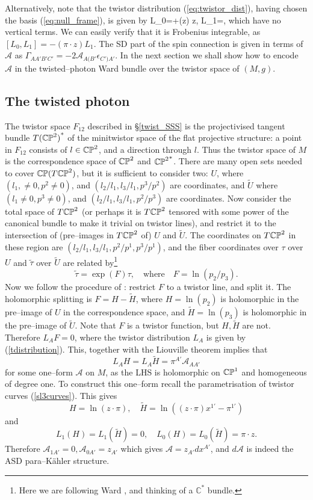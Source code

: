 Alternatively, note that the twistor distribution (\ref{eq:twistor_dist}), having chosen the basis (\ref{eq:null_frame}), is given by
\be
\label{tdistribution}
L_{0}=\pi\cdot{}+(z\cdot\pi) z\cdot{}, \quad
L_{1}=\pi\cdot{},
\ee
which have no vertical terms. We can easily verify that it is Frobenius integrable, as $[L_{0}, L_{1}]=-(\pi\cdot z)L_{1}$. The SD part of the
spin connection is given in terms of ${\mathcal A}$ as
$\Gamma_{AA'B'C'}=-2{\mathcal A}_{A(B'}\epsilon_{C')A'}$.
\koniec
In the next section we shall show how to encode
${\mathcal A}$ in the twisted--photon Ward bundle over the twistor space
of $(M, g)$.
\subsection{The twisted photon}
The twistor space $F_{12}$ described in \S\ref{twist_SSS} is the projectivised tangent bundle ${T(\mathbb{CP}^2)}^*$ of the minitwistor space of the flat projective structure: a point in $F_{12}$ consists of $l\in\mathbb{CP}^2$, and a direction through $l$. Thus the twistor space of $M$ is the correspondence space
of $\mathbb{CP}^2$ and ${\mathbb{CP}^2}^*$. 
There are many open sets needed to cover
$\mathbb{CP}(T\mathbb{CP}^2)$, but it is sufficient to consider two:
$U$, where $(l_1, \neq 0, p^2\neq 0)$, and $(l_2/l_1, l_3/l_1, p^3/p^2)$ are coordinates, and $\widetilde{U}$ where
$(l_1\neq 0, p^3\neq 0)$, and  $(l_2/l_1, l_3/l_1, p^2/p^3)$
are coordinates. Now consider the total
space of $T\mathbb{CP}^2$ (or perhaps it is $T\mathbb{CP}^2$ tensored
with some power of the canonical bundle to make it trivial on twistor
lines), and restrict it to the intersection of (pre--images in
$T\mathbb{CP}^2$
of) $U$ and $\widetilde{U}$. The coordinates on $T\mathbb{CP}^2$ in these
region are $(l_2/l_1, l_3/l_1, p^2/p^1, p^3/p^1)$, and the fiber
coordinates over $\tau$ over $U$ and $\tilde{\tau}$ over 
$\widetilde{U}$ are related by\footnote{Here we are following Ward \cite{wardtf},
and thinking of a $\mathbb{C}^*$ bundle.}
\[
\tilde \tau=\exp(F)\tau, \quad\mbox{where}\quad  
F=\ln{(p_2/p_3)}.
\]
Now we follow the procedure of \cite{wardtf}: restrict $F$ to a twistor line,
and split it.
The holomorphic splitting is $F=H-\widetilde{H}$, where
$H=\ln{(p_2)}$ is holomorphic in the pre--image of $U$ in the correspondence space, and 
$\widetilde{H}=\ln{(p_3)}$ is holomorphic in the pre--image of
$\widetilde{U}$. Note that $F$ is a twistor  function, but 
$H, \widetilde{H}$ are not. Therefore
$L_{A}F=0$, where the twistor distribution $L_{A}$
is given by (\ref{tdistribution}). This, 
together with the Liouville theorem
implies
that
\[
L_{A}H=L_{A}\widetilde{H}=\pi^{A'}\mathcal{A}_{AA'}
\]
for some one--form $\mathcal{A}$ on $M$, 
as the LHS is holomorphic on  $\mathbb{CP}^1$ and homogeneous of degree
one. To construct this one--form recall the parametrisation
of twistor curves (\ref{sl3curves}). This gives
\[
H=\ln{(z\cdot\pi)}, \quad\widetilde{H}=\ln{((z\cdot\pi)x^{1'}-\pi^{1'})}
\]
and
\[
L_{1}(H)=L_{1}(\widetilde{H})=0, \quad
L_{0}(H)=L_{0}(\widetilde{H})=\pi\cdot z.
\]
Therefore ${\mathcal A}_{1A'}=0, {\mathcal A}_{0A'}=z_{A'}$
which gives ${\mathcal A}=z_{A'}dx^{A'}$, and $d{\mathcal A}$
is indeed the ASD para--K\"ahler structure.
